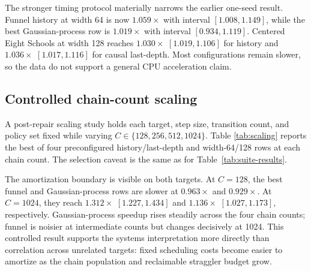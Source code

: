 \documentclass[conference]{IEEEtran}
\begin{document}
\begin{table}[t]
\centering
\caption{Fastest preconfigured bucketed configuration per model.  Values are
medians across five seeds; intervals hierarchically resample seeds and 30 warm
timings per method.  Best-row selection is descriptive.}
\label{tab:suite-results}
\small

\end{table}

The stronger timing protocol materially narrows the earlier one-seed result.
Funnel history at width 64 is now $1.059\times$ with interval
$[1.008,1.149]$, while the best Gaussian-process row is $1.019\times$ with
interval $[0.934,1.119]$.  Centered Eight Schools at width 128 reaches
$1.030\times$ $[1.019,1.106]$ for history and $1.036\times$
$[1.017,1.116]$ for causal last-depth.  Most configurations remain slower, so the data do not support
a general CPU acceleration claim.

\subsection{Controlled chain-count scaling}

A post-repair scaling study holds each target, step size, transition count, and
policy set fixed while varying $C\in\{128,256,512,1024\}$.  Table
\ref{tab:scaling} reports the best of four preconfigured history/last-depth and
width-64/128 rows at each chain count.  The selection caveat is the same as for
Table~\ref{tab:suite-results}.

\begin{table}[t]
\centering
\caption{Controlled CPU chain scaling with five seeds and 30 warm repetitions.
Intervals are hierarchical 95\% bootstrap intervals.}
\label{tab:scaling}
\small

\end{table}

The amortization boundary is visible on both targets.  At $C=128$, the best
funnel and Gaussian-process rows are slower at $0.963\times$ and
$0.929\times$.  At $C=1024$, they reach $1.312\times$
$[1.227,1.434]$ and $1.136\times$ $[1.027,1.173]$, respectively.
Gaussian-process speedup rises steadily across the four chain counts; funnel is
noisier at intermediate counts but changes decisively at 1024.  This controlled
result supports the systems interpretation more directly than correlation
across unrelated targets: fixed scheduling costs become easier to amortize as
the chain population and reclaimable straggler budget grow.
\end{document}
